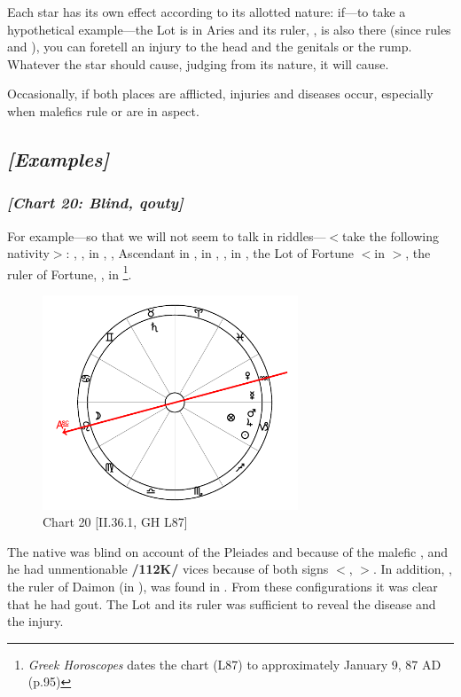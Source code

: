 Each star has its own effect according to its allotted nature: if—to take a hypothetical example—the Lot is in Aries and its ruler, \Mars, is also there (since \Mars\xspace rules \Aries\xspace and \Scorpio), you can foretell an injury
to the head and the genitals or the rump. Whatever the star should cause, judging from its nature, it will cause. 

Occasionally, if both places are afflicted, injuries and diseases occur, especially when malefics rule or
are in aspect. 
\newpage
\subsection{\textit{[Examples]}}
\subsubsection{\textit{[Chart 20: Blind, qouty]}}
For example—so that we will not seem to talk in riddles—$<$take the following nativity$>$: \Sun, \Jupiter,
\Mars\xspace in \Capricorn, \Moon, Ascendant in \Leo, \Saturn\xspace in \Taurus, \Venus, \Mercury\xspace in \Aquarius, the Lot of Fortune $<$in \Capricorn$>$, the ruler of Fortune, \Saturn, in \Taurus
\footnote{\textit{Greek Horoscopes} dates the chart (L87) to approximately January 9, 87 AD (p.95)}.

\clearpage
\begin{figure}
\centering
\vspace{-20pt}
\includegraphics[width=0.68\textwidth]{charts/2_36_1}
\caption{Chart 20 [II.36.1, GH L87]}
\label{fig:chart20}
\end{figure}

The native was blind on account of the Pleiades and because of the malefic \Saturn, and he had unmentionable \textbf{/112K/} vices because of both signs $<$\Capricorn, \Taurus$>$. In addition, \Jupiter, the ruler of Daimon (in \Pisces), was found in \Capricorn. From these configurations it was clear that he had gout. The Lot and its ruler was sufficient to reveal the disease and the injury.
\newpage

